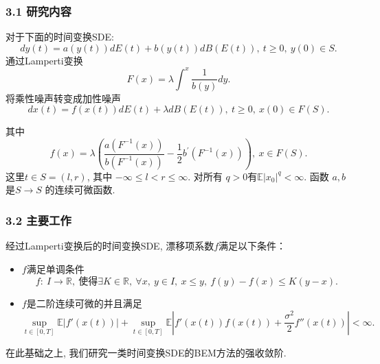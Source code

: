 \documentclass[notheorems,10pt,compress]{beamer}
\newcommand{\EE}{\mathbb{E}}
\numberwithin{figure}{section}
\numberwithin{table}{section}
\numberwithin{equation}{section}
\numberwithin{theorem}{section}
\numberwithin{definition}{section}
\numberwithin{lemma}{section}
\numberwithin{proposition}{section}
\numberwithin{corollary}{section}
\theoremstyle{example}
\begin{document}
	\begin{frame}		
		\frametitle{ 3.1 研究内容}
	    \setlength{\parindent}{2em}对于下面的时间变换SDE:
	    \begin{equation*}
	    	dy(t)=a(y(t))dE(t)+b(y(t))dB(E(t)),~t\geq0,~y(0)\in S.
	    \end{equation*}
	    通过Lamperti变换
	    \begin{equation*}\label{Lamperti}
	    	F(x)=\lambda\int^x\frac1{b(y)}dy.
	    \end{equation*}
	    将乘性噪声转变成加性噪声
    	\begin{equation*}\label{SDE}
    		dx(t)=f(x(t))dE(t) + \lambda dB(E(t)), ~ t\geq0,~x(0)\in F(S).
    	\end{equation*}
	    
	    其中
	    \begin{equation*}
	    	f(x)=\lambda\left(\frac{a(F^{-1}(x))}{b(F^{-1}(x))}-\frac12b^{\prime}(F^{-1}(x))\right),~ x\in F(S).
	    \end{equation*}
	    这里$t\in S=(l,r)$, 其中 $-\infty\leq l<r\leq\infty$.
	    对所有 $q > 0$有$\EE |x_0|^q < \infty$.  函数 $a,b$是$S\to S$ 的连续可微函数.
		
	\end{frame}
	
	\begin{frame}		
		\frametitle{ 3.2 主要工作}
		\hspace{2em}经过Lamperti变换后的时间变换SDE, 漂移项系数$f$满足以下条件：
		\begin{itemize}
			\setlength{\itemsep}{0.1pt}
			\item  $f$满足单调条件
			\begin{equation}
				f:~I\to\mathbb{R}  ,~使得 \exists K \in\mathbb{R},~\forall x,~y\in I,~x\leq y,~f(y)-f(x)\leq K(y-x).
			\end{equation}  
			\item $f$是二阶连续可微的并且满足
			\begin{equation}
				\sup\limits_{t\in[0,T]}\mathbb{E}\left|f'(x(t))\right|+
				\sup\limits_{t\in[0,T]}\mathbb{E}\left|f'(x(t))f(x(t))+
				\frac{\sigma^2}2f''(x(t))\right|<\infty.
			\end{equation}
		\end{itemize}
		\hspace{2em}在此基础之上, 我们研究一类时间变换SDE的BEM方法的强收敛阶.

	\end{frame}
	
\end{document}
